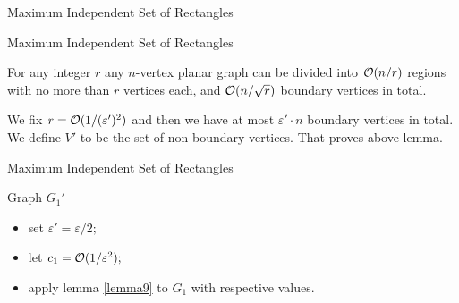 \documentclass[handout,usenames,dvipsnames]{beamer}
\begin{document}
\begin{frame}{Maximum Independent Set of Rectangles}
\end{frame}

\begin{frame}{Maximum Independent Set of Rectangles}
    \begin{fakt}[Federickson]
     For any integer $r$ any $n$-vertex planar graph can be divided into $\mathcal{O}(n/r)$ regions with no more than $r$ vertices each, and $\mathcal{O}(n/\sqrt r)$ boundary vertices in total.
    \end{fakt}
    \pause
    We fix $r = \mathcal{O}(1/(\varepsilon')^2)$ and then we have at most $\varepsilon' \cdot n$ boundary vertices in total. We define $V'$ to be the set of non-boundary vertices. That proves above lemma.
\end{frame}

\begin{frame}{Maximum Independent Set of Rectangles}
    \begin{block}{Graph $G_1'$}
        \begin{itemize}
            \item set $\varepsilon' = \varepsilon/2;$
            \pause
            \item let $c_1 = \mathcal{O}(1/\varepsilon^2);$
            \pause
            \item apply lemma \ref{lemma9} to $G_1$ with respective values.
        \end{itemize}
    \end{block}
\end{frame}
\end{document}
